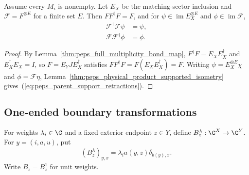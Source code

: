 \begin{lemma}%
    \label{thm:peps_parent_support_retractions}
    \leanok
    Assume every $M_i$ is nonempty. Let $E_X$ be the matching-sector
    inclusion and $\mathcal F=F^{\otimes E}$ for a finite set $E$.
    Then $FF^\dagger F=F$, and for $\psi\in\operatorname{im}E_X^{\otimes E}$
    and $\phi\in\operatorname{im}\mathcal F$,
    \begin{align}
        \mathcal F^\dagger\mathcal F\psi & =\psi, \\
        \mathcal F\mathcal F^\dagger\phi & =\phi.
        \label{eq:peps_parent_support_retractions}
    \end{align}
\end{lemma}
\begin{proof}\leanok
    By Lemma~\ref{thm:peps_full_multiplicity_bond_map},
    $F^\dagger F=E_XE_X^\dagger$ and $E_X^\dagger E_X=I$, so $F=E_YJE_X^\dagger$
    satisfies $FF^\dagger F=F(E_XE_X^\dagger)=F$. Writing
    $\psi=E_X^{\otimes E}\chi$ and $\phi=\mathcal F\eta$,
    Lemma~\ref{thm:peps_physical_product_supported_isometry} gives~(\ref{eq:peps_parent_support_retractions}).
\end{proof}

\subsection{One-ended boundary transformations}

\begin{definition}%
    \label{def:peps_parent_support_boundary_filter}
    \leanok
    For weights $\lambda_i\in\C$ and a fixed exterior endpoint
    $z\in Y$, define $B_z^\lambda:\C^X\to\C^Y$. For $y=(i,a,u)$, put
    \begin{align}
        (B_z^\lambda)_{y,x}
        =\lambda_i a(y,z)\delta_{b(y),x}.
        \label{eq:peps_parent_support_boundary_filter}
    \end{align}
    Write $B_z=B_z^1$ for unit weights.
\end{definition}

